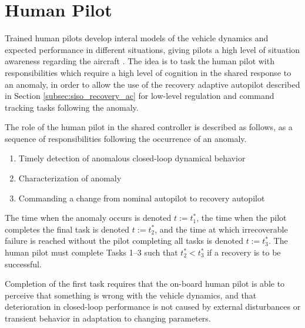 \section{Human Pilot} \label{sec:siso_sc_human}
Trained human pilots develop interal models of the vehicle dynamics and expected performance in different situations, giving pilots a high level of situation awareness regarding the aircraft \cite{endsley1995toward}. The idea is to task the human pilot with responsibilities which require a high level of cognition in the shared response to an anomaly, in order to allow the use of the recovery adaptive autopilot described in Section \ref{subsec:siso_recovery_ac} for low-level regulation and command tracking tasks following the anomaly. 

The role of the human pilot in the shared controller is described as follows, as a sequence of responsibilities following the occurrence of an anomaly.
\begin{enumerate}[label=\textbf{Task \arabic*.}, leftmargin=1.8cm]
	\item Timely detection of anomalous closed-loop dynamical behavior
	\item Characterization of anomaly
	\item Commanding a change from nominal autopilot to recovery autopilot
\end{enumerate}

The time when the anomaly occurs is denoted $t := t_1^*$, the time when the pilot completes the final task is denoted $t := t_2^*$, and the time at which irrecoverable failure is reached without the pilot completing all tasks is denoted $t := t_3^*$. The human pilot must complete Tasks 1--3 such that $t_2^* < t_3^*$ if a recovery is to be successful.

Completion of the first task requires that the on-board human pilot is able to perceive that something is wrong with the vehicle dynamics, and that deterioration in closed-loop performance is not caused by external disturbances or transient behavior in adaptation to changing parameters.

